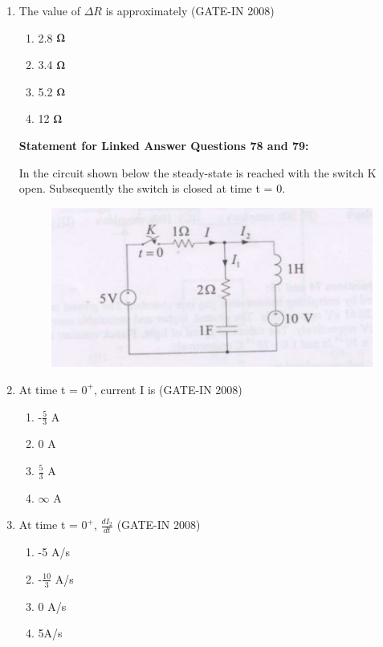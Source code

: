 \documentclass[journal,12pt,onecolumn]{IEEEtran}
\theoremstyle{remark}
\begin{document}
\begin{enumerate}
\item The value of $\Delta$$R$ is approximately \hfill{(GATE-IN 2008)}
\begin{multicols}{4}
           \begin{enumerate} 
              \item  2.8 $\ohm$       
              \item  3.4 $\ohm$
              \item  5.2 $\ohm$
              \item  12 $\ohm$
            \end{enumerate}
            \end{multicols}

\textbf{Statement for Linked Answer Questions 78 and 79:}

In the circuit shown below  the steady-state is reached with the switch K open. Subsequently the switch is
closed at time t = 0.

\begin{figure}[H]
    \centering
    \includegraphics[width=0.3\columnwidth]{figs/i34.jpg}
    \caption{}
    \label{fig:placeholder34}
\end{figure}

\item  At time t = $0^{+}$, current I is \hfill{(GATE-IN 2008)}
\begin{multicols}{4}
           \begin{enumerate} 
              \item  -$\frac{5}{3}$ A    
              \item  0 A
              \item  $\frac{5}{3}$ A
              \item  $\infty$ A
            \end{enumerate}
            \end{multicols}


\item At time t = $0^{+}$, $\frac{dI_2}{dt}$ \hfill{(GATE-IN 2008)}
\begin{multicols}{4}
           \begin{enumerate} 
              \item  -5 A/s       
              \item  -$\frac{10}{3}$ A/s 
              \item  0 A/s
              \item  5A/s
            \end{enumerate}
            \end{multicols}


\end{enumerate}
\end{document}
